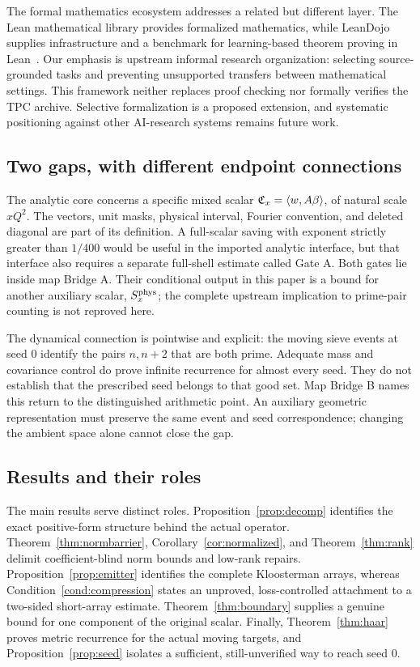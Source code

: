 The formal mathematics ecosystem addresses a related but different layer. The Lean mathematical library provides formalized mathematics, while LeanDojo supplies infrastructure and a benchmark for learning-based theorem proving in Lean~\cite{mathlib2019,yang2023leandojo}. Our emphasis is upstream informal research organization: selecting source-grounded tasks and preventing unsupported transfers between mathematical settings. This framework neither replaces proof checking nor formally verifies the TPC archive. Selective formalization is a proposed extension, and systematic positioning against other AI-research systems remains future work.

\subsection{Two gaps, with different endpoint connections}
The analytic core concerns a specific mixed scalar $\mathfrak C_x=\langle w,A\beta\rangle$, of natural scale $xQ^2$. The vectors, unit masks, physical interval, Fourier convention, and deleted diagonal are part of its definition. A full-scalar saving with exponent strictly greater than $1/400$ would be useful in the imported analytic interface, but that interface also requires a separate full-shell estimate called Gate A. Both gates lie inside map Bridge A. Their conditional output in this paper is a bound for another auxiliary scalar, $S_x^{\rm phys}$; the complete upstream implication to prime-pair counting is not reproved here.

The dynamical connection is pointwise and explicit: the moving sieve events at seed $0$ identify the pairs $n,n+2$ that are both prime. Adequate mass and covariance control do prove infinite recurrence for almost every seed. They do not establish that the prescribed seed belongs to that good set. Map Bridge B names this return to the distinguished arithmetic point. An auxiliary geometric representation must preserve the same event and seed correspondence; changing the ambient space alone cannot close the gap.

\subsection{Results and their roles}
The main results serve distinct roles. Proposition~\ref{prop:decomp} identifies the exact positive-form structure behind the actual operator. Theorem~\ref{thm:normbarrier}, Corollary~\ref{cor:normalized}, and Theorem~\ref{thm:rank} delimit coefficient-blind norm bounds and low-rank repairs. Proposition~\ref{prop:emitter} identifies the complete Kloosterman arrays, whereas Condition~\ref{cond:compression} states an unproved, loss-controlled attachment to a two-sided short-array estimate. Theorem~\ref{thm:boundary} supplies a genuine bound for one component of the original scalar. Finally, Theorem~\ref{thm:haar} proves metric recurrence for the actual moving targets, and Proposition~\ref{prop:seed} isolates a sufficient, still-unverified way to reach seed $0$.


